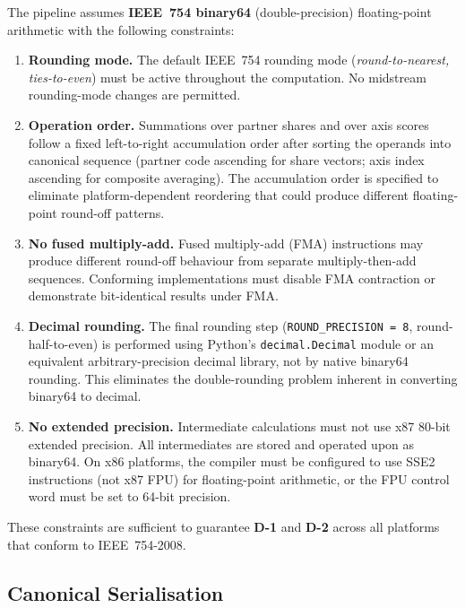 The pipeline assumes \textbf{IEEE~754 binary64} (double-precision)
floating-point arithmetic with the following constraints:

\begin{enumerate}
  \item \textbf{Rounding mode.}  The default IEEE~754 rounding mode
    (\emph{round-to-nearest, ties-to-even}) must be active throughout the
    computation.  No midstream rounding-mode changes are permitted.

  \item \textbf{Operation order.}  Summations over partner shares and over
    axis scores follow a fixed left-to-right accumulation order after
    sorting the operands into canonical sequence (partner code ascending for
    share vectors; axis index ascending for composite averaging).  The
    accumulation order is specified to eliminate platform-dependent
    reordering that could produce different floating-point round-off
    patterns.

  \item \textbf{No fused multiply-add.}  Fused multiply-add (FMA)
    instructions may produce different round-off behaviour from separate
    multiply-then-add sequences.  Conforming implementations must disable
    FMA contraction or demonstrate bit-identical results under FMA.

  \item \textbf{Decimal rounding.}  The final rounding step
    (\texttt{ROUND\_PRECISION\,=\,8}, round-half-to-even) is performed
    using Python's \texttt{decimal.Decimal} module or an equivalent
    arbitrary-precision decimal library, not by native binary64 rounding.
    This eliminates the double-rounding problem inherent in converting
    binary64 to decimal.

  \item \textbf{No extended precision.}  Intermediate calculations must not
    use x87 80-bit extended precision.  All intermediates are stored and
    operated upon as binary64.  On x86 platforms, the compiler must be
    configured to use SSE2 instructions (not x87 FPU) for floating-point
    arithmetic, or the FPU control word must be set to 64-bit precision.
\end{enumerate}

These constraints are sufficient to guarantee \textbf{D-1} and \textbf{D-2}
across all platforms that conform to IEEE~754-2008.

\subsection{Canonical Serialisation}\label{sec:det:serialisation}

